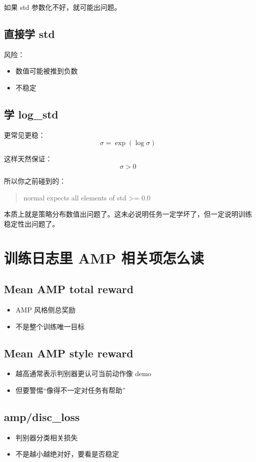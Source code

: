 \documentclass[11pt,a4paper]{article}
\begin{document}
如果 std 参数化不好，就可能出问题。

\subsection*{直接学 std}
风险：
\begin{itemize}
\item 数值可能被推到负数
\item 不稳定
\end{itemize}

\subsection*{学 log\_std}
更常见更稳：
\[
\sigma = \exp(\log \sigma)
\]

这样天然保证：
\[
\sigma > 0
\]

所以你之前碰到的：
\begin{quote}
normal expects all elements of std >= 0.0
\end{quote}

本质上就是策略分布数值出问题了。这未必说明任务一定学坏了，但一定说明训练稳定性出问题了。

\section{训练日志里 AMP 相关项怎么读}
\subsection*{Mean AMP total reward}
\begin{itemize}
\item AMP 风格侧总奖励
\item 不是整个训练唯一目标
\end{itemize}

\subsection*{Mean AMP style reward}
\begin{itemize}
\item 越高通常表示判别器更认可当前动作像 demo
\item 但要警惕“像得不一定对任务有帮助”
\end{itemize}

\subsection*{amp/disc\_loss}
\begin{itemize}
\item 判别器分类相关损失
\item 不是越小越绝对好，要看是否稳定
\end{itemize}
\end{document}
